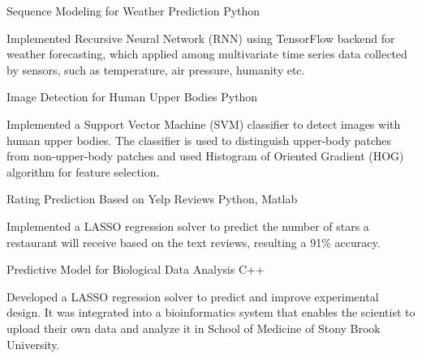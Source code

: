 \begin{cventries}

\projentry
{Sequence Modeling for Weather Prediction} %
{Python} %
{ %
\begin{cvitems}
\item{Implemented Recursive Neural Network ({RNN}) using TensorFlow backend for weather forecasting, which applied among multivariate time series data collected by sensors, such as temperature, air pressure, humanity etc.}
\end{cvitems}
}


\projentry
{Image Detection for Human Upper Bodies} %
{Python} %
{
\begin{cvitems}
\item{Implemented a Support Vector Machine ({SVM}) classifier to detect images with human upper bodies. The classifier is used to distinguish upper-body patches from non-upper-body patches and used Histogram of Oriented Gradient (HOG) algorithm for feature selection.}
\end{cvitems}
}


\projentry
{Rating Prediction Based on Yelp Reviews} %
{Python, Matlab} %
{ %
\begin{cvitems}
\item{Implemented a {LASSO} regression solver to predict the number of stars a restaurant will receive based on the text reviews, resulting a 91\% accuracy.}
\end{cvitems}
}


\projentry
{Predictive Model for Biological Data Analysis} %
{C++} %
{ %
\begin{cvitems}
\item{Developed a LASSO regression solver to predict and improve experimental design. It was integrated into a bioinformatics system that enables the scientist to upload their own data and analyze it in School of Medicine of Stony Brook University.}
\end{cvitems}
}



\end{cventries}
